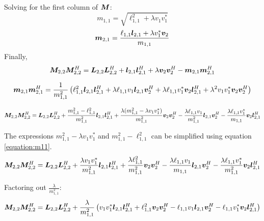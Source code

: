 \begin{appendices}
Solving for the first column of $\bm{M}$:
\begin{equation} \label{equation:m11}
m_{1,1} = \sqrt{\ell_{1,1}^2 + \lambda v_1 v_1^{*}}
\end{equation}
\begin{equation}
\bm{m}_{2,1} = \frac{\ell_{1,1}\bm{l}_{2,1} + \lambda v_1^{*}\bm{v}_2}{m_{1,1}}
\end{equation}
Finally,
\begin{equation}
\bm{M}_{2,2}\bm{M}_{2,2}^H = \bm{L}_{2,2}\bm{L}_{2,2}^H + \bm{l}_{2,1}\bm{l}_{2,1}^H + \lambda\bm{v}_2\bm{v}_2^H - \bm{m}_{2,1}\bm{m}_{2,1}^H
\end{equation}

\begin{equation}
\bm{m}_{2,1}\bm{m}_{2,1}^H = \frac{1}{m_{1,1}^2}\left(\ell_{1,1}^2\bm{l}_{2,1}\bm{l}_{2,1}^H + \lambda\ell_{1,1}v_1\bm{l}_{2,1}\bm{v}_2^H + \lambda\ell_{1,1}v_1^{*}\bm{v}_2\bm{l}_{2,1}^H + \lambda^2 v_1 v_1^{*} \bm{v}_2\bm{v}_2^H\right)
\end{equation}

\begin{equation}
\bm{M}_{2,2}\bm{M}_{2,2}^H = \bm{L}_{2,2}\bm{L}_{2,2}^H + \frac{m_{1,1}^2 - \ell_{1,1}^2}{m_{1,1}^2}\bm{l}_{2,1}\bm{l}_{2,1}^H + \frac{\lambda(m_{1,1}^2 - \lambda v_1 v_1^{*})}{m_{1,1}^2}\bm{v}_2\bm{v}_2^H - \frac{\lambda\ell_{1,1}v_1}{m_{1,1}^2}\bm{l}_{2,1}\bm{v}_2^H - \frac{\lambda\ell_{1,1}v_1^{*}}{m_{1,1}}\bm{v}_2\bm{l}_{2,1}^H
\end{equation}

The expressions $m_{1,1}^2 - \lambda v_1 v_1^{*}$ and $m_{1,1}^2 - \ell_{1,1}^2$ can be simplified using equation \ref{equation:m11}.
\begin{equation}
\bm{M}_{2,2}\bm{M}_{2,2}^H = \bm{L}_{2,2}\bm{L}_{2,2}^H + \frac{\lambda v_1 v_1^{*} }{m_{1,1}^2}\bm{l}_{2,1}\bm{l}_{2,1}^H + \frac{\lambda \ell_{1,1}^2}{m_{1,1}^2}\bm{v}_2\bm{v}_2^H - \frac{\lambda\ell_{1,1}v_1}{m_{1,1}}\bm{l}_{2,1}\bm{v}_2^H - \frac{\lambda\ell_{1,1}v_1^{*}}{m_{1,1}^2}\bm{v}_2\bm{l}_{2,1}^H
\end{equation}

Factoring out $\frac{\lambda}{m_{1,1}^2}$:
\begin{equation}
\bm{M}_{2,2}\bm{M}_{2,2}^H = \bm{L}_{2,2}\bm{L}_{2,2}^H + \frac{\lambda}{m_{1,1}^2}\left( v_1 v_1^{*} \bm{l}_{2,1}\bm{l}_{2,1}^H + \ell_{1,1}^2\bm{v}_2\bm{v}_2^H - \ell_{1,1}v_1\bm{l}_{2,1}\bm{v}_2^H - \ell_{1,1}v_1^{*}\bm{v}_2\bm{l}_{2,1}^H\right)
\end{equation}


\end{appendices}
